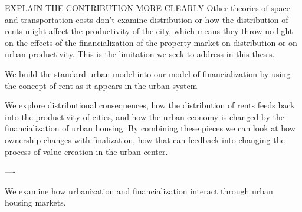 EXPLAIN THE CONTRIBUTION MORE CLEARLY
Other theories of space and transportation costs  don't examine distribution or how the distribution of rents might affect the productivity of the city, which means they throw no light on the effects of the financialization of the property market on distribution or on urban productivity.  This is the limitation we seek to address in this thesis. 

We build the  standard urban model into our model of financialization by using the concept of rent as it appears in the urban system


We explore distributional consequences, how the distribution of rents feeds back into the productivity of cities, and how the urban economy is changed by the financialization of urban housing. %
By combining these pieces we can look at how ownership changes with finalization, how that can feedback into changing the process of value creation in the urban center.





----







We examine how urbanization and financialization interact through urban housing markets. %


